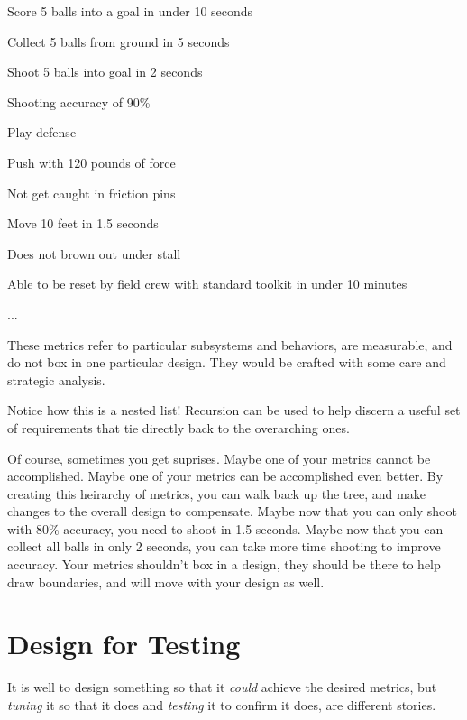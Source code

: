 \begin{asparaenum}[1)]
	\item Score 5 balls into a goal in under 10 seconds
	\begin{asparaenum}[\ \ a)]
		\item Collect 5 balls from ground in 5 seconds
		\item Shoot 5 balls into goal in 2 seconds
		\item Shooting accuracy of 90\%
	\end{asparaenum}
	\item Play defense
	\begin{asparaenum}[\ \ a)]
		\item Push with 120 pounds of force
		\item Not get caught in friction pins
		\item Move 10 feet in 1.5 seconds
		\item Does not brown out under stall
	\end{asparaenum}
	\item Able to be reset by field crew with standard toolkit in under 10 minutes
	\item ...
\end{asparaenum}

These metrics refer to particular subsystems and behaviors, are measurable, and do not box in one particular design. They would be crafted with some care and strategic analysis.

Notice how this is a nested list! Recursion can be used to help discern a useful set of requirements that tie directly back to the overarching ones.

Of course, sometimes you get suprises. Maybe one of your metrics cannot be accomplished. Maybe one of your metrics can be accomplished even better. By creating this heirarchy of metrics, you can walk back up the tree, and make changes to the overall design to compensate. Maybe now that you can only shoot with 80\% accuracy, you need to shoot in 1.5 seconds. Maybe now that you can collect all balls in only 2 seconds, you can take more time shooting to improve accuracy. Your metrics shouldn't box in a design, they should be there to help draw boundaries, and will move with your design as well.

\section{Design for Testing}

It is well to design something so that it \textit{could} achieve the desired metrics, but \textit{tuning} it so that it does and \textit{testing} it to confirm it does, are different stories. 


